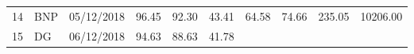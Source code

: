 \documentclass[
  11pt,
]{article}
\begin{document}
\begin{longtable}[]{@{}llllllllll@{}}
\begin{minipage}[t]{0.05\columnwidth}\raggedright
14\strut
\end{minipage} & \begin{minipage}[t]{0.07\columnwidth}\raggedright
BNP\strut
\end{minipage} & \begin{minipage}[t]{0.11\columnwidth}\raggedright
05/12/2018\strut
\end{minipage} & \begin{minipage}[t]{0.07\columnwidth}\raggedright
96.45\strut
\end{minipage} & \begin{minipage}[t]{0.07\columnwidth}\raggedright
92.30\strut
\end{minipage} & \begin{minipage}[t]{0.07\columnwidth}\raggedright
43.41\strut
\end{minipage} & \begin{minipage}[t]{0.07\columnwidth}\raggedright
64.58\strut
\end{minipage} & \begin{minipage}[t]{0.07\columnwidth}\raggedright
74.66\strut
\end{minipage} & \begin{minipage}[t]{0.08\columnwidth}\raggedright
235.05\strut
\end{minipage} & \begin{minipage}[t]{0.09\columnwidth}\raggedright
10206.00\strut
\end{minipage}\tabularnewline
\begin{minipage}[t]{0.05\columnwidth}\raggedright
15\strut
\end{minipage} & \begin{minipage}[t]{0.07\columnwidth}\raggedright
DG\strut
\end{minipage} & \begin{minipage}[t]{0.11\columnwidth}\raggedright
06/12/2018\strut
\end{minipage} & \begin{minipage}[t]{0.07\columnwidth}\raggedright
94.63\strut
\end{minipage} & \begin{minipage}[t]{0.07\columnwidth}\raggedright
88.63\strut
\end{minipage} & \begin{minipage}[t]{0.07\columnwidth}\raggedright
41.78\strut
\end{minipage} & \begin{minipage}[t]{0.07\columnwidth}\raggedright

\end{minipage}
\end{longtable}
\end{document}
